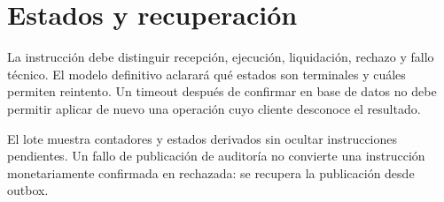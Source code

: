 \section{Estados y recuperación}
La instrucción debe distinguir recepción, ejecución, liquidación, rechazo y fallo técnico. El modelo definitivo aclarará qué estados son terminales y cuáles permiten reintento. Un timeout después de confirmar en base de datos no debe permitir aplicar de nuevo una operación cuyo cliente desconoce el resultado.

El lote muestra contadores y estados derivados sin ocultar instrucciones pendientes. Un fallo de publicación de auditoría no convierte una instrucción monetariamente confirmada en rechazada: se recupera la publicación desde outbox.
